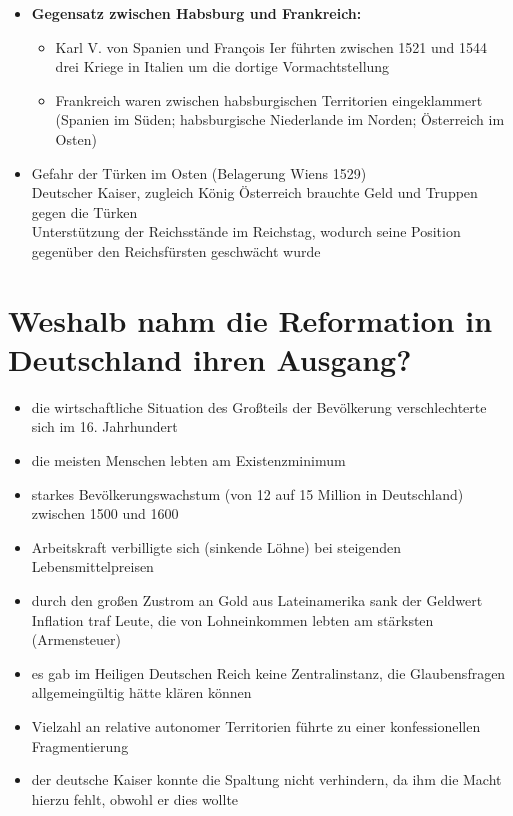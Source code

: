 \documentclass[11pt,a4paper]{article}
\begin{document}
\begin{itemize}
\item \textbf{Gegensatz zwischen Habsburg und Frankreich:}
	
	\begin{itemize}
	\item Karl V. von Spanien und Fran\c{c}ois Ier führten zwischen 1521 und 1544 drei Kriege in Italien um die dortige Vormachtstellung
	\item Frankreich waren zwischen habsburgischen Territorien eingeklammert (Spanien im Süden; habsburgische Niederlande im Norden; Österreich im Osten)
	\end{itemize}
\item Gefahr der Türken im Osten (Belagerung Wiens 1529)\\
 Deutscher Kaiser, zugleich König Österreich brauchte Geld und Truppen gegen die Türken\\
 Unterstützung der Reichsstände im Reichstag, wodurch seine Position gegenüber den Reichsfürsten geschwächt wurde



\end{itemize}


\section*{\textsf{Weshalb nahm die Reformation in Deutschland ihren Ausgang?}}


\begin{itemize}
\item die wirtschaftliche Situation des Großteils der Bevölkerung verschlechterte sich im 16. Jahrhundert
\item die meisten Menschen lebten am Existenzminimum
\item starkes Bevölkerungswachstum (von 12 auf 15 Million in Deutschland) zwischen 1500 und 1600
\item Arbeitskraft verbilligte sich (sinkende Löhne) bei steigenden Lebensmittelpreisen
\item durch den großen Zustrom an Gold aus Lateinamerika sank der Geldwert\\
 Inflation traf Leute, die von Lohneinkommen lebten am stärksten (Armensteuer)

\vspace{1cm}

\item es gab im Heiligen Deutschen Reich keine Zentralinstanz, die Glaubensfragen allgemeingültig hätte klären können
\item Vielzahl an relative autonomer Territorien führte zu einer konfessionellen Fragmentierung
\item der deutsche Kaiser konnte die Spaltung nicht verhindern, da ihm die Macht hierzu fehlt, obwohl er dies wollte
\end{itemize}
\end{document}
